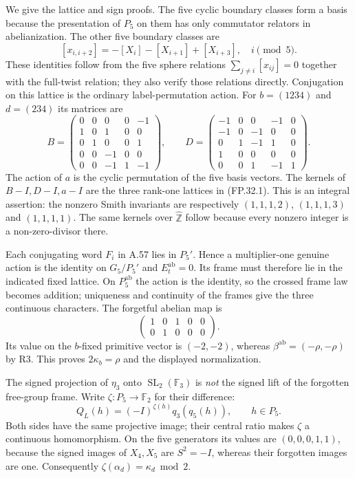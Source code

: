We give the lattice and sign proofs. The five cyclic boundary classes
form a basis because the presentation of $P_5$ on them has only
commutator relators in abelianization. The other five boundary classes
are
\[
 [x_{i,i+2}]=-[X_i]-[X_{i+1}]+[X_{i+3}],
 \quad i\pmod5.
\]
These identities follow from the five sphere relations
$\sum_{j\ne i}[x_{ij}]=0$ together with the full-twist relation;
they also verify those relations directly. Conjugation on this lattice
is the ordinary label-permutation action. For $b=(1234)$ and
$d=(234)$ its matrices are
\[
 B=\begin{pmatrix}
 0&0&0&0&-1\\1&0&1&0&0\\0&1&0&0&1\\
 0&0&-1&0&0\\0&0&-1&1&-1
 \end{pmatrix},\qquad
 D=\begin{pmatrix}
 -1&0&0&-1&0\\-1&0&-1&0&0\\0&1&-1&1&0\\
 1&0&0&0&0\\0&0&1&-1&1
 \end{pmatrix}.
 \tag{FP.32.3}
\]
The action of $a$ is the cyclic permutation of the five basis vectors.
The kernels of $B-I,D-I,a-I$ are the three rank-one lattices in
(FP.32.1). This is an integral assertion: the nonzero Smith invariants
are respectively $(1,1,1,2)$, $(1,1,1,3)$ and $(1,1,1,1)$.
The same kernels over $\widehat{\mathbb Z}$ follow because every
nonzero integer is a non-zero-divisor there.

Each conjugating word $F_i$ in A.57 lies in $P_5'$. Hence a
multiplier-one genuine action is the identity on $G_5/P_5'$ and
$E_t^{\mathrm{ab}}=0$. Its frame must therefore lie in the indicated
fixed lattice. On $P_5^{\mathrm{ab}}$ the action is the identity,
so the crossed frame law becomes addition; uniqueness and continuity
of the frames give the three continuous characters.
The forgetful abelian map is
\[
 \begin{pmatrix}1&0&1&0&0\\0&1&0&0&0\end{pmatrix}.
\]
Its value on the $b$-fixed primitive vector is $(-2,-2)$, whereas
$\beta^{\mathrm{ab}}=(-\rho,-\rho)$ by R3. This proves
$2\kappa_b=\rho$ and the displayed normalization.

The signed projection of $\eta_3$ onto
$\operatorname{SL}_2(\mathbb F_3)$ is \emph{not} the signed lift
of the forgotten free-group frame. Write $\zeta:P_5\to\mathbb F_2$
for their difference:
\[
 Q_L(h)=(-I)^{\zeta(h)}q_3(q_5(h)),\qquad h\in P_5.
 \tag{FP.32.4}
\]
Both sides have the same projective image; their central ratio makes
$\zeta$ a continuous homomorphism. On the five generators its values
are $(0,0,0,1,1)$, because the signed images of $X_4,X_5$ are
$S^2=-I$, whereas their forgotten images are one.
Consequently $\zeta(\alpha_d)=\kappa_d\bmod2$.

